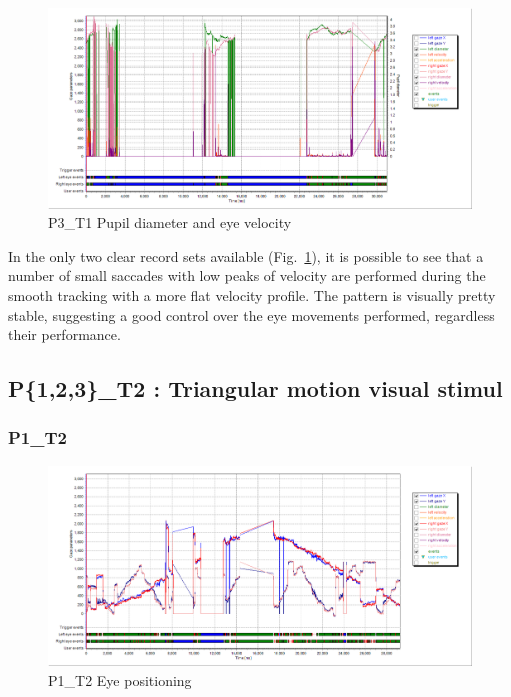 \begin{figure}[h]
  \centering
  \includegraphics[width=.8\textwidth]{figures/graphs/P3_T1(sinusoid)_VP.png}
  \caption[P3\_T1 pupil velocity]{P3\_T1 Pupil diameter and eye velocity}
  \label{fig:P3_T1_vel}
\end{figure}

In the only two clear record sets available (Fig.~\ref{fig:P3_T1_vel}), it is possible to see that a number of small saccades with low peaks of velocity are performed during the smooth tracking with a more flat velocity profile. The pattern is visually pretty stable, suggesting a good control over the eye movements performed, regardless their performance.



\subsection{P\{1,2,3\}\_T2 : Triangular motion visual stimul}
\label{sec:P123_T2}

\subsubsection{P1\_T2}
\label{sec:P1_T2}

\begin{figure}[h]
  \centering
  \includegraphics[width=.8\textwidth]{figures/graphs/P1_T2(triangular)_XY.png}
  \caption[P1\_T2 Eye positioning]{P1\_T2 Eye positioning}
  \label{fig:P1_T2_pos}
\end{figure}

